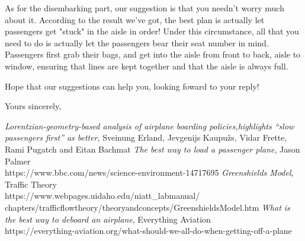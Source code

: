 \documentclass{article}
\theoremstyle{definition}
\theoremstyle{remark}
\numberwithin{equation}{section}
\begin{document}
	As for the disembarking part, our suggestion is that you needn't worry much about it. According to the result we've got, the best plan is actually let passengers get "stuck" in the aisle in order! Under this circumstance, all that you need to do is actually let the passengers bear their seat number in mind. Passengers first grab their bags, and get into the aisle from front to back, aisle to window, ensuring that lines are kept together and that the aisle is always full.

	Hope that our suggestions can help you, looking foward to your reply!

	\noindent Yours sincerely,

	\noindent {}
	
	
	\newpage
	\thispagestyle{empty}
	\renewcommand\refname{References}
	\begin{thebibliography}{100}
	 \textit{Lorentzian-geometry-based analysis of airplane boarding policies,highlights “slow passengers first” as better}, 
	Sveinung Erland, Jevgenijs Kaupužs, Vidar Frette, Rami Pugatch and  Eitan Bachmat
	 \textit{The best way to load a passenger plane}, Jason Palmer\\
	https://www.bbc.com/news/science-environment-14717695
	 \textit{Greenshields Model}, Traffic Theory\\
	https://www.webpages.uidaho.edu/niatt\_labmanual/\\chapters/trafficflowtheory/theoryandconcepts/GreenshieldsModel.htm
	 \textit{What is the best way to deboard an airplane}, Everything Aviation\\
	https://everything-aviation.org/what-should-we-all-do-when-getting-off-a-plane
	\end{thebibliography}
\end{document}
